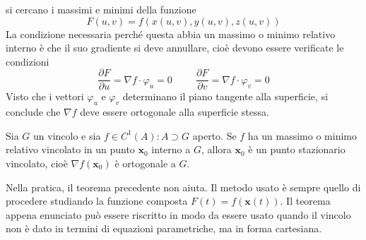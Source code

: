 \documentclass[11pt, a4paper]{scrartcl}
\theoremstyle{definition}
\numberwithin{esempio}{section}
\theoremstyle{definition}
\numberwithin{obs}{section}
\numberwithin{nota}{section}
\numberwithin{equation}{subsection}
\begin{document}
si cercano i massimi e minimi della funzione
\[
F(u,v) = f(x(u,v) , y(u,v), z(u,v))
\] 
La condizione necessaria perch\'e questa abbia un massimo o minimo relativo interno \`e che il suo gradiente si deve annullare, cio\`e devono essere verificate le condizioni 
\begin{equation}
	\frac{\partial F}{\partial u} = \nabla f \cdot \varphi _u = 0 \hspace{1cm}\frac{\partial F}{\partial v} = \nabla f\cdot \varphi _v = 0
\end{equation}
Visto che i vettori $\varphi _u$ e $\varphi _v$ determinano il piano tangente alla superficie, si conclude che $\nabla f$ deve essere ortogonale alla superficie stessa. 
\begin{teorema}
	{}{}
	Sia $G$ un vincolo e sia $f \in C^1(A): A \supset G $ aperto. 
	Se $f$ ha un massimo o minimo relativo vincolato in un punto $\mathbf{x} _0 $ interno a $G$, allora $\mathbf{x} _0$ \`e un punto stazionario vincolato, cio\`e $\nabla f(\mathbf{x} _0)$ \`e ortogonale a $G$.
\end{teorema}
Nella pratica, il teorema precedente non aiuta. 
Il metodo usato \`e sempre quello di procedere studiando la funzione composta $F (t) = f(\mathbf{x} (t))$.
Il teorema appena enunciato pu\`o essere riscritto in modo da essere usato quando il vincolo non \`e dato in termini di equazioni parametriche, ma in forma cartesiana.
\end{document}
